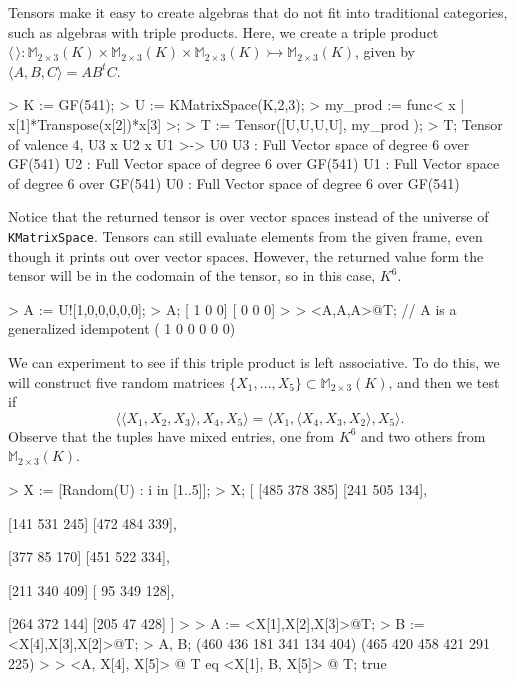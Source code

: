 \begin{example}[BBTripleProduct]
Tensors make it easy to create algebras that do not fit into traditional categories, such as algebras with triple products.
Here, we create a triple product $\langle \,\rangle : \mathbb{M}_{2\times 3}(K)\times \mathbb{M}_{2\times 3}(K)\times\mathbb{M}_{2\times 3}(K)\rightarrowtail \mathbb{M}_{2\times 3}(K)$, given by $\langle A, B, C\rangle = AB^tC$.

\begin{code}
> K := GF(541);
> U := KMatrixSpace(K,2,3);
> my_prod := func< x | x[1]*Transpose(x[2])*x[3] >;
> T := Tensor([U,U,U,U], my_prod );
> T;
Tensor of valence 4, U3 x U2 x U1 >-> U0
U3 : Full Vector space of degree 6 over GF(541)
U2 : Full Vector space of degree 6 over GF(541)
U1 : Full Vector space of degree 6 over GF(541)
U0 : Full Vector space of degree 6 over GF(541)
\end{code}

Notice that the returned tensor is over vector spaces instead of the universe of {\tt KMatrixSpace}.
Tensors can still evaluate elements from the given frame, even though it prints out over vector spaces. 
However, the returned value form the tensor will be in the codomain of the tensor, so in this case, $K^6$.
\begin{code}
> A := U![1,0,0,0,0,0];
> A;
[  1   0   0]
[  0   0   0]
> 
> <A,A,A>@T;  // A is a generalized idempotent
(  1   0   0   0   0   0)
\end{code}

We can experiment to see if this triple product is left associative.
To do this, we will construct five random matrices $\{ X_1,\dots,X_5\}\subset \mathbb{M}_{2\times 3}(K)$, and then we test if 
\[ \langle \langle X_1, X_2, X_3 \rangle, X_4, X_5\rangle = \langle X_1, \langle X_4, X_3, X_2\rangle, X_5\rangle. \]
Observe that the tuples have mixed entries, one from $K^6$ and two others from $\mathbb{M}_{2\times 3}(K)$. 

\begin{code}
> X := [Random(U) : i  in [1..5]];
> X;
[
    [485 378 385]
    [241 505 134],

    [141 531 245]
    [472 484 339],

    [377  85 170]
    [451 522 334],

    [211 340 409]
    [ 95 349 128],

    [264 372 144]
    [205  47 428]
]
> 
> A := <X[1],X[2],X[3]>@T;
> B := <X[4],X[3],X[2]>@T;
> A, B;
(460 436 181 341 134 404)
(465 420 458 421 291 225)
> 
> <A, X[4], X[5]> @ T eq <X[1], B, X[5]> @ T;
true
\end{code}


\end{example}
